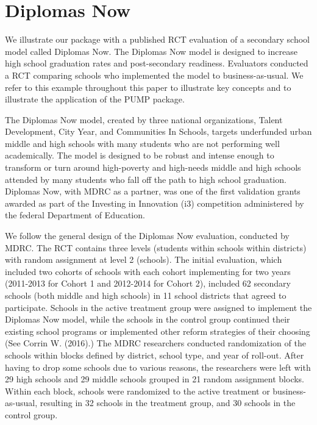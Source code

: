 \documentclass[
]{article}
\begin{document}
\section{Diplomas Now}
\label{sec:diplomas}

We illustrate our package with a published RCT evaluation of a secondary
school model called Diplomas Now. The Diplomas Now model is designed to
increase high school graduation rates and post-secondary readiness.
Evaluators conducted a RCT comparing schools who implemented the model
to business-as-usual. We refer to this example throughout this paper to
illustrate key concepts and to illustrate the application of the PUMP
package.

The Diplomas Now model, created by three national organizations, Talent
Development, City Year, and Communities In Schools, targets underfunded
urban middle and high schools with many students who are not performing
well academically. The model is designed to be robust and intense enough
to transform or turn around high-poverty and high-needs middle and high
schools attended by many students who fall off the path to high school
graduation. Diplomas Now, with MDRC as a partner, was one of the first
validation grants awarded as part of the Investing in Innovation (i3)
competition administered by the federal Department of Education.

We follow the general design of the Diplomas Now evaluation, conducted
by MDRC. The RCT contains three levels (students within schools within
districts) with random assignment at level 2 (schools). The initial
evaluation, which included two cohorts of schools with each cohort
implementing for two years (2011-2013 for Cohort 1 and 2012-2014 for
Cohort 2), included 62 secondary schools (both middle and high schools)
in 11 school districts that agreed to participate. Schools in the active
treatment group were assigned to implement the Diplomas Now model, while
the schools in the control group continued their existing school
programs or implemented other reform strategies of their choosing (See
Corrin W. (2016).) The MDRC researchers conducted randomization of the
schools within blocks defined by district, school type, and year of
roll-out. After having to drop some schools due to various reasons, the
researchers were left with 29 high schools and 29 middle schools grouped
in 21 random assignment blocks. Within each block, schools were
randomized to the active treatment or business-as-usual, resulting in 32
schools in the treatment group, and 30 schools in the control group.
\end{document}
